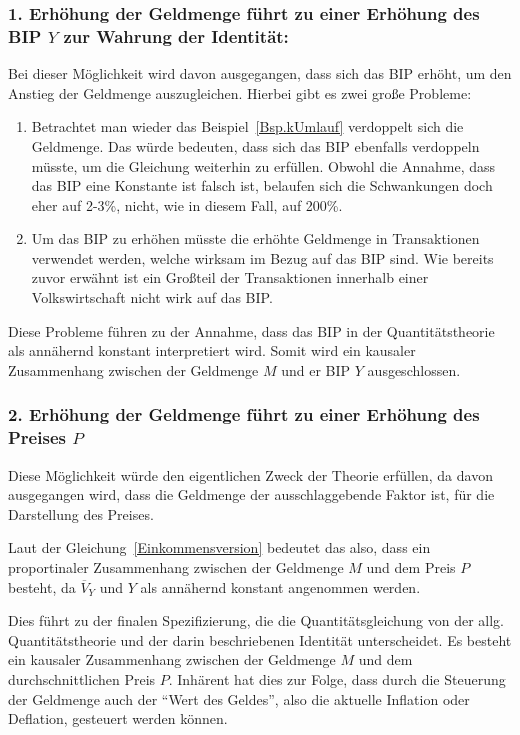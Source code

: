 \subsubsection*{1. Erhöhung der Geldmenge führt zu einer Erhöhung des BIP $Y$ zur Wahrung der Identität:}
Bei dieser Möglichkeit wird davon ausgegangen, dass sich das BIP erhöht, um den Anstieg der Geldmenge auszugleichen. Hierbei gibt es zwei große Probleme:

\begin{enumerate}
    \item Betrachtet man wieder das Beispiel\, \vref*{Bsp.kUmlauf} verdoppelt sich die Geldmenge. Das würde bedeuten, dass sich das BIP ebenfalls verdoppeln müsste, um die Gleichung weiterhin zu erfüllen. Obwohl die Annahme, dass das BIP eine Konstante ist falsch ist, belaufen sich die Schwankungen doch eher auf 2-3\%, nicht, wie in diesem Fall, auf 200\%.
    \item Um das BIP zu erhöhen müsste die erhöhte Geldmenge in Transaktionen verwendet werden, welche wirksam im Bezug auf das BIP sind. Wie bereits zuvor erwähnt ist ein Großteil der Transaktionen innerhalb einer Volkswirtschaft nicht wirk auf das BIP.
\end{enumerate}

Diese Probleme führen zu der Annahme, dass das BIP in der Quantitätstheorie als annähernd konstant interpretiert wird. Somit wird ein kausaler Zusammenhang zwischen der Geldmenge $M$ und er BIP $Y$ ausgeschlossen.

\subsubsection*{2. Erhöhung der Geldmenge führt zu einer Erhöhung des Preises $P$}
Diese Möglichkeit würde den eigentlichen Zweck der Theorie erfüllen, da davon ausgegangen wird, dass die Geldmenge der ausschlaggebende Faktor ist, für die Darstellung des Preises.

Laut der Gleichung\, \vref*{Einkommensversion} bedeutet das also, dass ein proportinaler Zusammenhang zwischen der Geldmenge $M$ und dem Preis $P$ besteht, da $\overline{V}_Y$ und $Y$ als annähernd konstant angenommen werden.

Dies führt zu der finalen Spezifizierung, die die Quantitätsgleichung von der allg. Quantitätstheorie und der darin beschriebenen Identität unterscheidet. Es besteht ein kausaler Zusammenhang zwischen der Geldmenge $M$ und dem durchschnittlichen Preis $P$.
Inhärent hat dies zur Folge, dass durch die Steuerung der Geldmenge auch der \enquote{Wert des Geldes}, also die aktuelle Inflation oder Deflation, gesteuert werden können.

